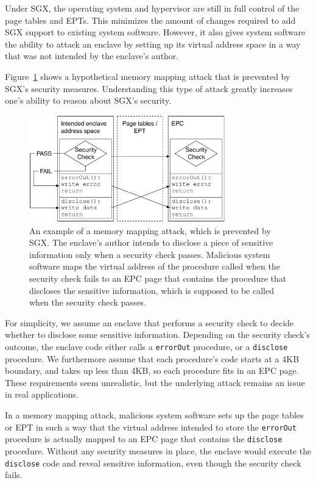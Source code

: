 
Under SGX, the operating system and hypervisor are still in full control of the
page tables and EPTs. This minimizes the amount of changes required to add SGX
support to existing system software. However, it also gives system software the
ability to attack an enclave by setting up its virtual address space in a way
that was not intended by the enclave's author.

Figure~\ref{fig:sgx_mapping_attack} shows a hypothetical memory mapping attack
that is prevented by SGX's security measures. Understanding this type of attack
greatly increases one's ability to reason about SGX's security.

\begin{figure}[hbt]
  \centering
  \includegraphics[width=85mm]{figures/sgx_mapping_attack.pdf}
  \caption{
    An example of a memory mapping attack, which is prevented by SGX. The
    enclave's author intends to disclose a piece of sensitive information only
    when a security check passes. Malicious system software maps the virtual
    address of the procedure called when the security check fails to an EPC
    page that contains the procedure that discloses the sensitive information,
    which is supposed to be called when the security check passes.
  }
  \label{fig:sgx_mapping_attack}
\end{figure}

For simplicity, we assume an enclave that performs a security check to decide
whether to disclose some sensitive information. Depending on the security
check's outcome, the enclave code either calls a \texttt{errorOut} procedure,
or a \texttt{disclose} procedure. We furthermore assume that each procedure's
code starts at a 4KB boundary, and takes up less than 4KB, so each procedure
fits in an EPC page. These requirements seem unrealistic, but the underlying
attack remains an issue in real applications.

In a memory mapping attack, malicious system software sets up the page tables
or EPT in such a way that the virtual address intended to store the
\texttt{errorOut} procedure is actually mapped to an EPC page that contains the
\texttt{disclose} procedure. Without any security measures in place, the
enclave would execute the \texttt{disclose} code and reveal sensitive
information, even though the security check fails.

